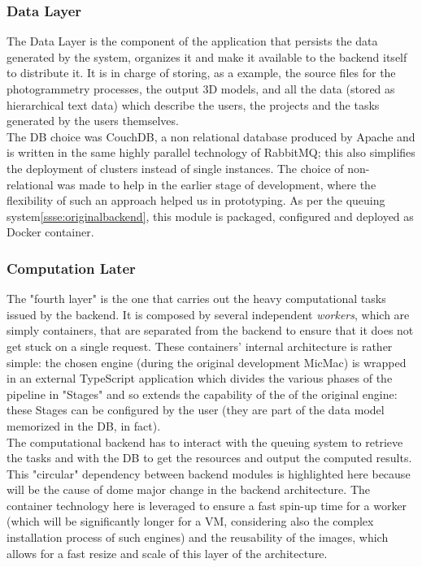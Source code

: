   \subsubsection{Data Layer}
  \label{ssse:originaldatalayer}
    The Data Layer is the component of the application that persists the data generated by the system, organizes it and make it available to the backend itself to distribute it. It is in charge of storing, as a example, the source files for the photogrammetry processes, the output 3D models, and all the data (stored as hierarchical text data) which describe the users, the projects and the tasks generated by the users themselves.\\
    The DB choice was CouchDB, a non relational database produced by Apache and is written in the same highly parallel technology of RabbitMQ; this also simplifies the deployment of clusters instead of single instances. The choice of non-relational was made to help in the earlier stage of development, where the flexibility of such an approach helped us in prototyping. As per the queuing system\ref{ssse:originalbackend}, this module is packaged, configured and deployed as Docker container.
    
  \subsubsection{Computation Later}
  \label{ssse:originalcomputationlayer}
    The "fourth layer" is the one that carries out the heavy computational tasks issued by the backend. It is composed by several independent \textit{workers}, which are simply containers, that are separated from the backend to ensure that it does not get stuck on a single request. These containers' internal architecture is rather simple: the chosen engine (during the original development MicMac) is wrapped in an external TypeScript application which divides the various phases of the pipeline in "Stages" and so extends the capability of the of the original engine: these Stages can be configured by the user (they are part of the data model memorized in the DB, in fact).\\
    The computational backend has to interact with the queuing system to retrieve the tasks and with the DB to get the resources and output the computed results. This "circular" dependency between backend modules is highlighted here because will be the cause of dome major change in the backend architecture. The container technology here is leveraged to ensure a fast spin-up time for a worker (which will be significantly longer for a VM, considering also the complex installation process of such engines) and the reusability of the images, which allows for a fast resize and scale of this layer of the architecture.
